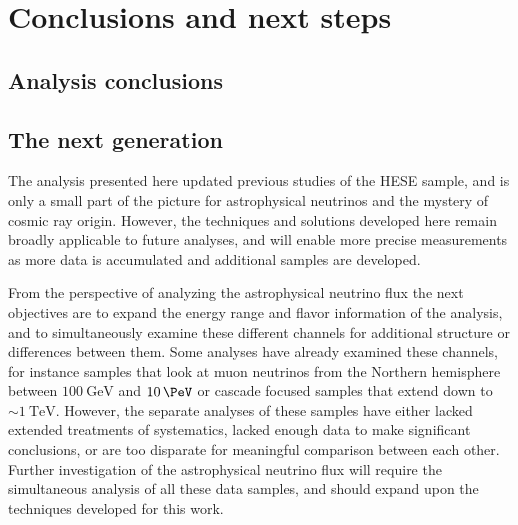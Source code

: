\chapter{Conclusions and next steps\label{chapter:conclusions}}
\section{Analysis conclusions\label{sec:analysis_conclusions}}
\begingroup
\graphicspath{{results/HESE_Final_Paper/}}

\endgroup
\FloatBarrier

\section{The next generation}
The analysis presented here updated previous studies of the HESE sample, and is only a small part of the picture for astrophysical neutrinos and the mystery of cosmic ray origin.
However, the techniques and solutions developed here remain broadly applicable to future analyses, and will enable more precise measurements as more data is accumulated and additional samples are developed.

From the perspective of analyzing the astrophysical neutrino flux the next objectives are to expand the energy range and flavor information of the analysis, and to simultaneously examine these different channels for additional structure or differences between them.
Some analyses have already examined these channels, for instance samples that look at muon neutrinos from the Northern hemisphere between $\SI{100}\GeV$ and $\SI{10}\PeV$ or cascade focused samples that extend down to $\sim\SI{1}\TeV$.
However, the separate analyses of these samples have either lacked extended treatments of systematics, lacked enough data to make significant conclusions, or are too disparate for meaningful comparison between each other.
Further investigation of the astrophysical neutrino flux will require the simultaneous analysis of all these data samples, and should expand upon the techniques developed for this work.

